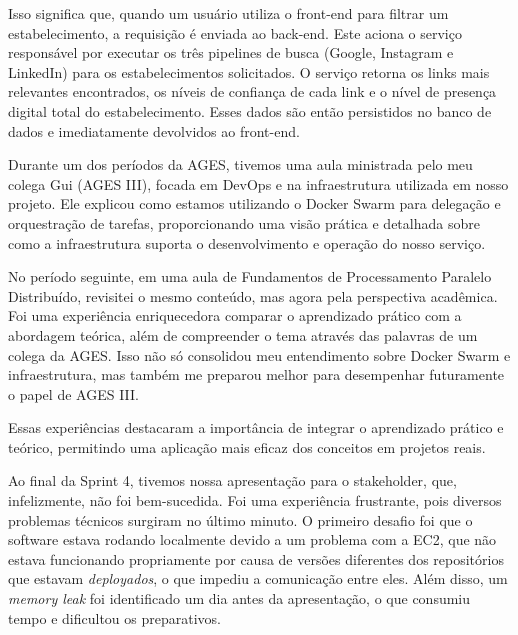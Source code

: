 \indent Isso significa que, quando um usuário utiliza o front-end para filtrar um estabelecimento, a requisição é enviada ao back-end. Este aciona o serviço responsável por executar os três pipelines de busca (Google, Instagram e LinkedIn) para os estabelecimentos solicitados. O serviço retorna os links mais relevantes encontrados, os níveis de confiança de cada link e o nível de presença digital total do estabelecimento. Esses dados são então persistidos no banco de dados e imediatamente devolvidos ao front-end.\par

\indent Durante um dos períodos da AGES, tivemos uma aula ministrada pelo meu colega Gui (AGES III), focada em DevOps e na infraestrutura utilizada em nosso projeto. Ele explicou como estamos utilizando o Docker Swarm para delegação e orquestração de tarefas, proporcionando uma visão prática e detalhada sobre como a infraestrutura suporta o desenvolvimento e operação do nosso serviço.\par

\indent No período seguinte, em uma aula de Fundamentos de Processamento Paralelo Distribuído, revisitei o mesmo conteúdo, mas agora pela perspectiva acadêmica. Foi uma experiência enriquecedora comparar o aprendizado prático com a abordagem teórica, além de compreender o tema através das palavras de um colega da AGES. Isso não só consolidou meu entendimento sobre Docker Swarm e infraestrutura, mas também me preparou melhor para desempenhar futuramente o papel de AGES III.\par

\indent Essas experiências destacaram a importância de integrar o aprendizado prático e teórico, permitindo uma aplicação mais eficaz dos conceitos em projetos reais.\par

\indent \originaltab{}Ao final da Sprint 4, tivemos nossa apresentação para o stakeholder, que, infelizmente, não foi bem-sucedida. Foi uma experiência frustrante, pois diversos problemas técnicos surgiram no último minuto. O primeiro desafio foi que o software estava rodando localmente devido a um problema com a EC2, que não estava funcionando propriamente por causa de versões diferentes dos repositórios que estavam \textit{deployados}, o que impediu a comunicação entre eles. Além disso, um \textit{memory leak} foi identificado um dia antes da apresentação, o que consumiu tempo e dificultou os preparativos.\par

